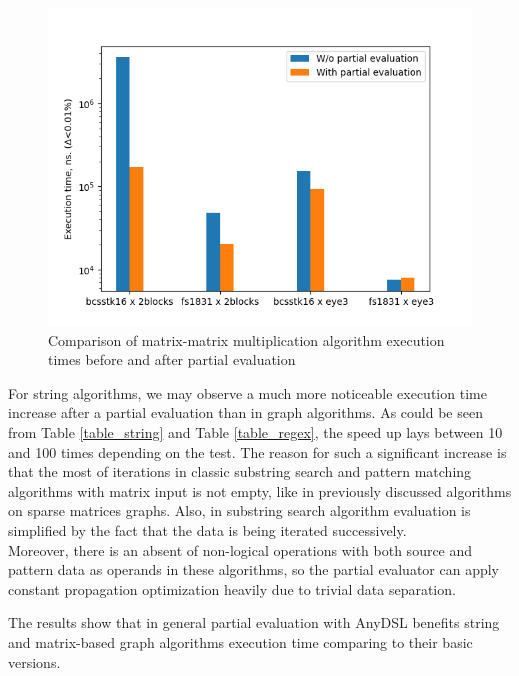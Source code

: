 \documentclass[conference]{IEEEtran}
\begin{document}
\begin{figure}[H]
	\centering
	\includegraphics[scale=0.6]{matrix-mult}
	\caption{Comparison of matrix-matrix multiplication algorithm execution times before and after partial evaluation}
	\label{fig:multpe}
\end{figure}

For string algorithms, we may observe a much more noticeable execution time increase after a partial evaluation than in graph algorithms. As could be seen from Table \ref{table_string} and Table \ref{table_regex}, the speed up lays between 10 and 100 times depending on the test. The reason for such a significant increase is that the most of iterations in classic substring search and pattern matching algorithms \cite{cormen2009introduction} with matrix input is not empty, like in previously discussed algorithms on sparse matrices graphs. Also, in substring search algorithm evaluation is simplified by the fact that the data is being iterated successively.\\
Moreover, there is an absent of non-logical operations with both source and pattern data as operands in these algorithms, so the partial evaluator can apply constant propagation optimization heavily due to trivial data separation.

The results show that in general partial evaluation with AnyDSL benefits string and matrix-based graph algorithms execution time comparing to their basic versions.

\end{document}
